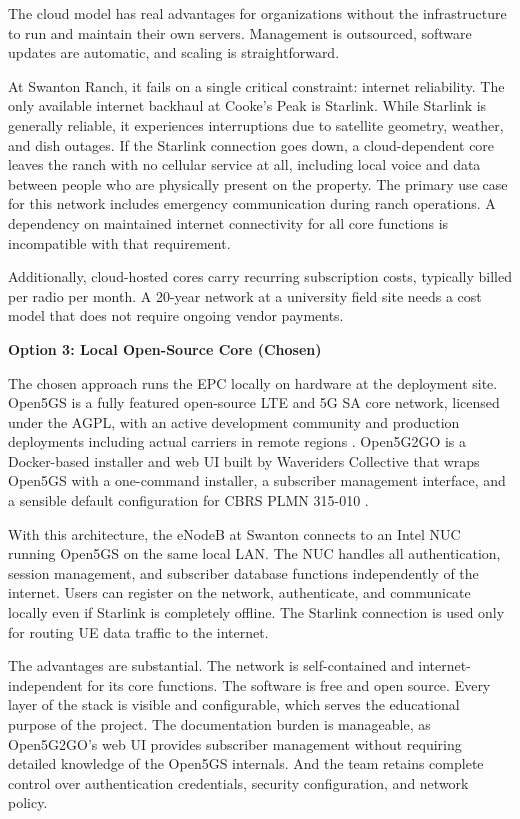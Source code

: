 \documentclass[
    left=1.5in,
    right=1.25in,
    top=1.25in,
    bottom=1.25in
]{CalPolySeniorProject}
\begin{document}
The cloud model has real advantages for organizations without the infrastructure
to run and maintain their own servers. Management is outsourced, software updates
are automatic, and scaling is straightforward.

At Swanton Ranch, it fails on a single critical constraint: internet reliability.
The only available internet backhaul at Cooke's Peak is Starlink. While Starlink
is generally reliable, it experiences interruptions due to satellite geometry,
weather, and dish outages. If the Starlink connection goes down, a cloud-dependent
core leaves the ranch with no cellular service at all, including local voice and
data between people who are physically present on the property. The primary use
case for this network includes emergency communication during ranch operations. A
dependency on maintained internet connectivity for all core functions is
incompatible with that requirement.

Additionally, cloud-hosted cores carry recurring subscription costs, typically
billed per radio per month. A 20-year network at a university field site needs a
cost model that does not require ongoing vendor payments.

\textbf{Option 3: Local Open-Source Core (Chosen)}

The chosen approach runs the EPC locally on hardware at the deployment site.
Open5GS is a fully featured open-source LTE and 5G SA core network, licensed
under the AGPL, with an active development community and production deployments
including actual carriers in remote regions
\autocite{waveriders2025open5g2go,houtz2026wlpc}. Open5G2GO is a Docker-based
installer and web UI built by Waveriders Collective that wraps Open5GS with a
one-command installer, a subscriber management interface, and a sensible default
configuration for CBRS PLMN 315-010 \autocite{waveriders2025open5g2go}.

With this architecture, the eNodeB at Swanton connects to an Intel NUC running
Open5GS on the same local LAN. The NUC handles all authentication, session
management, and subscriber database functions independently of the internet.
Users can register on the network, authenticate, and communicate locally even if
Starlink is completely offline. The Starlink connection is used only for routing
UE data traffic to the internet.

The advantages are substantial. The network is self-contained and
internet-independent for its core functions. The software is free and open
source. Every layer of the stack is visible and configurable, which serves the
educational purpose of the project. The documentation burden is manageable, as
Open5G2GO's web UI provides subscriber management without requiring detailed
knowledge of the Open5GS internals. And the team retains complete control over
authentication credentials, security configuration, and network policy.
\end{document}
